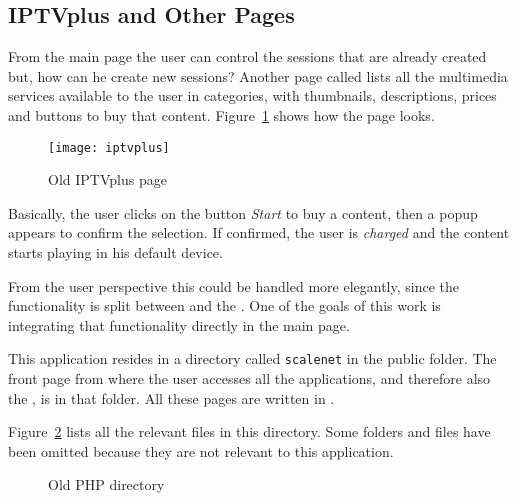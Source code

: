 \subsection{IPTVplus and Other Pages} %
\label{sub:iptvplus}

From the main  page the user can control the sessions that are already created but, how can he create new sessions?
Another page called  lists all the multimedia services available to the user in categories, with thumbnails, descriptions, prices and buttons to buy that content.
Figure~\ref{fig:iptvplus} shows how the page looks.

\begin{figure}[htbp]
  \centering
    \texttt{[image: iptvplus]}
  \caption{Old IPTVplus page}
  \label{fig:iptvplus}
\end{figure}

Basically, the user clicks on the button \textit{Start} to buy a content, then a popup appears to confirm the selection.
If confirmed, the user is \textit{charged} and the content starts playing in his default device.

From the user perspective this could be handled more elegantly, since the functionality is split between  and the .
One of the goals of this work is integrating that functionality directly in the main  page.

This  application resides in a directory called \texttt{scalenet} in the  public folder.
The front page from where the user accesses all the  applications, and therefore also the , is in that folder.
All these pages are written in .

Figure~\ref{fig:iptvdir} lists all the relevant  files in this directory.
Some folders and files have been omitted because they are not relevant to this application.

\begin{figure}[htbp]
  \caption{Old PHP directory}
  \label{fig:iptvdir}
\end{figure}

